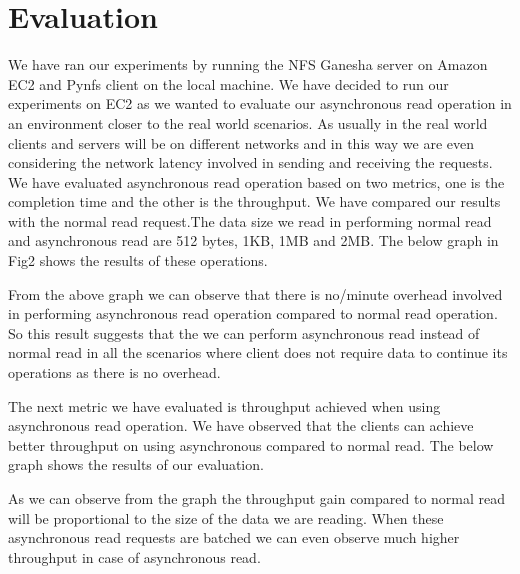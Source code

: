 \section{Evaluation}

	We have ran our experiments by running the NFS Ganesha server on Amazon EC2 and Pynfs client on the local machine. We have decided to run our experiments on EC2 as we wanted to evaluate our asynchronous read operation in an environment closer to the real world scenarios. As usually in the real world clients and servers will be on different networks and in this way we are even considering the network latency involved in sending and receiving the requests. We have evaluated asynchronous read operation based on two metrics, one is the completion time and the other is the throughput. We have compared our results with the normal read request.The data size we read in performing normal read and asynchronous read are 512 bytes, 1KB, 1MB and 2MB. The below graph in Fig2 shows the results of these operations.
	

	From the above graph we can observe that there is no/minute overhead involved in performing asynchronous read operation compared to normal read operation. So this result suggests that the  we can perform asynchronous read instead of normal read in all the scenarios where client does not  require data to continue its operations as there is no overhead. 

	The next metric we have evaluated is throughput achieved when using asynchronous read operation. We have observed that the clients can achieve better throughput on using asynchronous compared to normal read. The below graph shows the results of our evaluation.


	As we can observe from the graph the throughput gain compared to normal read will be proportional to the size of the data we are reading. When these asynchronous read requests are batched we can even observe much higher throughput in case of asynchronous read.  



